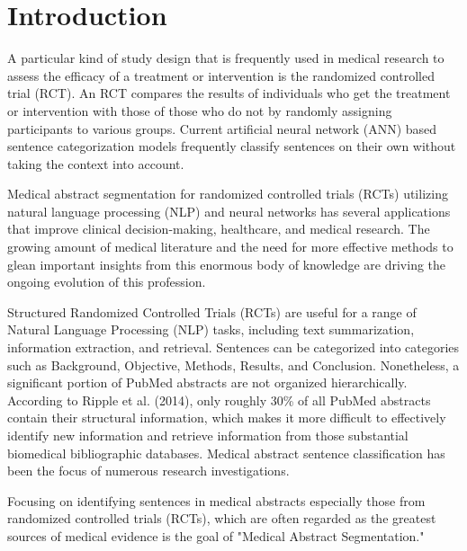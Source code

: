 \documentclass[conference]{IEEEtran}
\begin{document}
\section{Introduction}
A particular kind of study design that is frequently used in medical research to assess the efficacy of a treatment or intervention is the randomized controlled trial (RCT). An RCT compares the results of individuals who get the treatment or intervention with those of those who do not by randomly assigning participants to various groups. Current artificial neural network (ANN) based sentence categorization models frequently classify sentences on their own without taking the context into account.

Medical abstract segmentation for randomized controlled trials (RCTs) utilizing natural language processing (NLP) and neural networks has several applications that improve clinical decision-making, healthcare, and medical research. The growing amount of medical literature and the need for more effective methods to glean important insights from this enormous body of knowledge are driving the ongoing evolution of this profession.

Structured Randomized Controlled Trials (RCTs) are useful for a range of Natural Language Processing (NLP) tasks, including text summarization, information extraction, and retrieval. Sentences can be categorized into categories such as Background, Objective, Methods, Results, and Conclusion. Nonetheless, a significant portion of PubMed abstracts are not organized hierarchically. According to Ripple et al. (2014), only roughly 30\% of all PubMed abstracts contain their structural information, which makes it more difficult to effectively identify new information and retrieve information from those substantial biomedical bibliographic databases. Medical abstract sentence classification has been the focus of numerous research investigations.

Focusing on identifying sentences in medical abstracts especially those from randomized controlled trials (RCTs), which are often regarded as the greatest sources of medical evidence is the goal of "Medical Abstract Segmentation."
\end{document}
